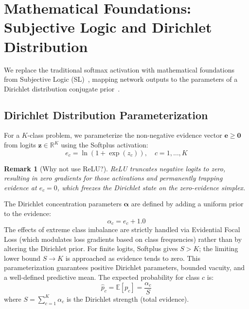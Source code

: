 \documentclass[letterpaper]{article} %
\newcommand{\R}{\mathbb{R}}
\newcommand{\E}{\mathbb{E}}
\newtheorem{remark}{Remark}
\begin{document}
\section{Mathematical Foundations: Subjective Logic and Dirichlet Distribution}\label{sec:math}

We replace the traditional softmax activation with mathematical foundations from Subjective Logic (SL)~\cite{josang2016subjective}, mapping network outputs to the parameters of a Dirichlet distribution conjugate prior~\cite{sensoy2018evidential}.

\subsection{Dirichlet Distribution Parameterization}
For a $K$-class problem, we parameterize the non-negative evidence vector $\bm{e} \ge \bm{0}$ from logits $\bm{z} \in \R^K$ using the Softplus activation:
\begin{equation}\label{eq:softplus}
    e_c = \ln(1 + \exp(z_c)), \quad c = 1, \ldots, K
\end{equation}
\begin{remark}[Why not use ReLU?]
ReLU truncates negative logits to zero, resulting in zero gradients for those activations and permanently trapping evidence at $e_c = 0$, which freezes the Dirichlet state on the zero-evidence simplex.
\end{remark}
The Dirichlet concentration parameters $\bm{\alpha}$ are defined by adding a uniform prior to the evidence:
\begin{equation}\label{eq:alpha}
    \alpha_c = e_c + 1.0
\end{equation}
The effects of extreme class imbalance are strictly handled via Evidential Focal Loss (which modulates loss gradients based on class frequencies) rather than by altering the Dirichlet prior. For finite logits, Softplus gives $S>K$; the limiting lower bound $S \to K$ is approached as evidence tends to zero. This parameterization guarantees positive Dirichlet parameters, bounded vacuity, and a well-defined predictive mean. The expected probability for class $c$ is:
\begin{equation}\label{eq:p_hat}
    \hat{p}_c = \E[p_c] = \frac{\alpha_c}{S}
\end{equation}
where $S = \sum_{c=1}^K \alpha_c$ is the Dirichlet strength (total evidence).
\end{document}
